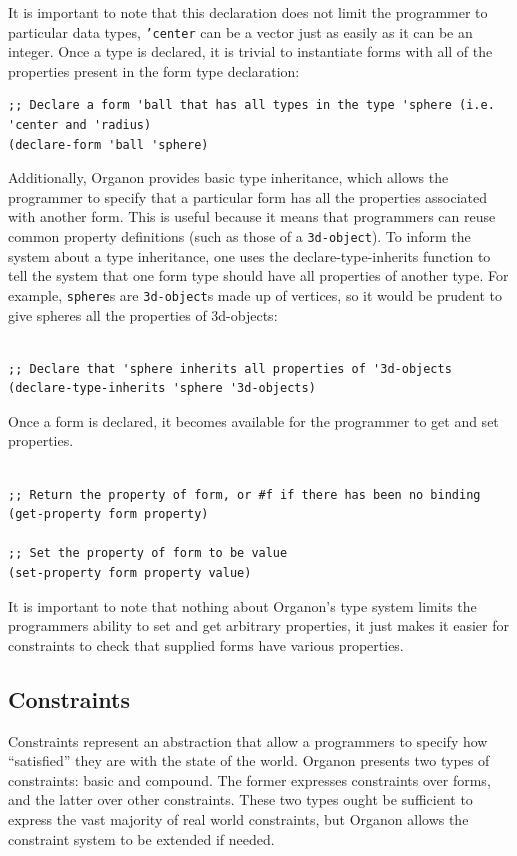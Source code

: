 \documentclass[12pt,a4paper]{article}
\begin{document}
It is important to note that this declaration does not limit the programmer to particular data types, \texttt{'center} can be a vector just as easily as it can be an integer.  Once a type is declared, it is trivial to instantiate forms with all of the properties present in the form type declaration:
\begin{lstlisting}
;; Declare a form 'ball that has all types in the type 'sphere (i.e. 'center and 'radius)
(declare-form 'ball 'sphere) 
\end{lstlisting}

Additionally, Organon provides basic type inheritance, which allows the programmer to specify that a particular form has all the properties associated with another form.   This is useful because it means that programmers can reuse common property definitions (such as those of a \texttt{3d-object}).  To inform the system about a type inheritance, one uses the declare-type-inherits function to tell the system that one form type should have all properties of another type.  For example, \texttt{sphere}s are \texttt{3d-object}s made up of vertices, so it would be prudent to give spheres all the properties of 3d-objects:
\begin{lstlisting}

;; Declare that 'sphere inherits all properties of '3d-objects
(declare-type-inherits 'sphere '3d-objects)
\end{lstlisting}

Once a form is declared, it becomes available for the programmer to get and set properties.
\begin{lstlisting}

;; Return the property of form, or #f if there has been no binding
(get-property form property)

;; Set the property of form to be value 
(set-property form property value)
\end{lstlisting}

It is important to note that nothing about Organon's type system limits the programmers ability to set and get arbitrary properties, it just makes it easier for constraints to check that supplied forms have various properties. 

\subsection{Constraints}
Constraints represent an abstraction that allow a programmers to specify how ``satisfied'' they are with the state of the world.  Organon presents two types of constraints: basic and compound.  The former expresses constraints over forms, and the latter over other constraints.  These two types ought be sufficient to express the vast majority of real world constraints, but Organon allows the constraint system to be extended if needed.
\end{document}
